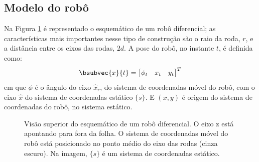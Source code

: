 \subsection{Modelo do robô}
Na Figura \ref{fig:diff-drive-schematic} é representado o esquemático de um robô diferencial; as características mais importantes nesse tipo de construção 
são o raio da roda, $r$, e a distância entre os eixos das rodas, $2d$. A 
pose do robô, no instante $t$, é definida como:
\begin{equation}
  \bsubvec{x}{t} = \begin{bmatrix}
    \phi_t & x_t & y_t
  \end{bmatrix}^T
  \label{eq:robot-pose}
\end{equation}
em que $\phi$ é o ângulo do eixo $\hat{x}_r$, do sistema de coordenadas móvel 
do robô, com o eixo $\hat{x}$ do sistema de coordenadas estático $\{s\}$. E $(x, y)$ é origem do sistema de coordenadas do robô, no sistema estático.
\begin{figure}[h]
  \centering
  
  \caption[Esquemático de um robô diferencial]{Visão superior do esquemático de um robô diferencial. O eixo z está apontando para fora 
  da folha. O sistema de coordenadas móvel do robô está posicionado no ponto médio do eixo das rodas  (cinza escuro). Na imagem, $\{s\}$ é um sistema de coordenadas estático.}
  \label{fig:diff-drive-schematic}
\end{figure}


